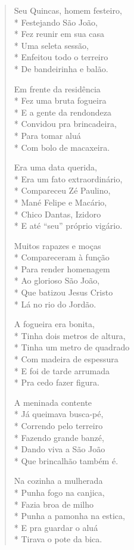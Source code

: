 \begin{verse}
Seu Quincas, homem festeiro, \\*
Festejando São João,\\*
Fez reunir em sua casa\\*
Uma seleta sessão,\\*
Enfeitou todo o terreiro\\*
De bandeirinha e balão.

Em frente da residência\\*
Fez uma bruta fogueira\\*
E a gente da rendondeza\\*
Convidou pra brincadeira,\\*
Para tomar aluá\\*
Com bolo de macaxeira.

Era uma data querida,\\*
Era um fato extraordinário,\\*
Compareceu Zé Paulino,\\*
Mané Felipe e Macário, \\*
Chico Dantas, Izidoro\\*
E até “seu” próprio vigário.

Muitos rapazes e moças\\*
Compareceram à função\\*
Para render homenagem\\*
Ao glorioso São João,\\*
Que batizou Jesus Cristo\\*
Lá no rio do Jordão.

A fogueira era bonita,\\*
Tinha dois metros de altura,\\*
Tinha um metro de quadrado\\*
Com madeira de espessura\\*
E foi de tarde arrumada\\*
Pra cedo fazer figura.

A meninada contente\\*
Já queimava busca-pé,\\*
Correndo pelo terreiro\\*
Fazendo grande banzé,\\*
Dando viva a São João\\*
Que brincalhão também é.

Na cozinha a mulherada\\*
Punha fogo na canjica,\\*
Fazia broa de milho\\*
Punha a pamonha na estica,\\*
E pra guardar o aluá\\*
Tirava o pote da bica.


\end{verse}

